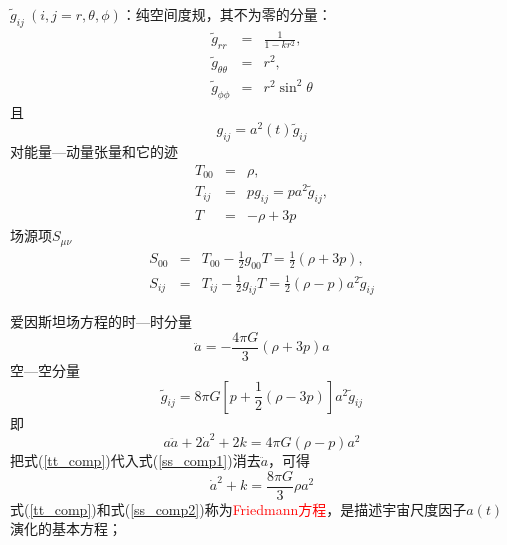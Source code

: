 \documentclass[12pt,a4paper]{article}
\begin{document}
$\tilde{g}_{ij}~ (i, j = r, \theta, \phi)$：纯空间度规，其不为零的分量：
\begin{eqnarray}
\nonumber \tilde{g}_{rr} &=& \frac{1}{1-kr^2}, \\
\nonumber \tilde{g}_{\theta\theta} &=& r^2, \\
\tilde{g}_{\phi\phi} &=& r^2 \sin^2 \theta
\end{eqnarray}
且
\begin{equation}
g_{ij} = a^2(t) \tilde{g}_{ij}
\end{equation}
对能量---动量张量和它的迹
\begin{eqnarray}
\nonumber T_{00} &=& \rho, \\
\nonumber T_{ij} &=& p g_{ij} = pa^2 \tilde{g}_{ij}, \\
T &=& -\rho +3p
\end{eqnarray}
场源项$S_{\mu\nu}$
\begin{eqnarray}
S_{00} &=& T_{00} -\frac{1}{2} g_{00} T = \frac{1}{2}(\rho +3p), \\
S_{ij}  &=& T_{ij} -\frac{1}{2} g_{ij} T = \frac{1}{2}(\rho -p) a^2 \tilde{g}_{ij}
\end{eqnarray}

爱因斯坦场方程的时—时分量
\begin{equation}
\ddot{a} = -\frac{4\pi G}{3} (\rho +3p) a
\label{tt_comp}
\end{equation}
空—空分量
\begin{equation}
[a\ddot{a} + 2\dot{a}^2 +2k] \tilde{g}_{ij} = 8\pi G\left[p +\frac{1}{2}(\rho -3p) \right] a^2 \tilde{g}_{ij}
\end{equation}
即
\begin{equation}
a\ddot{a} + 2\dot{a}^2 +2k = 4\pi G(\rho -p) a^2
\label{ss_comp1}
\end{equation}
把式(\ref{tt_comp})代入式(\ref{ss_comp1})消去$\ddot{a}$，可得
\begin{equation}
\dot{a}^2 +k = \frac{8\pi G}{3} \rho a^2
\label{ss_comp2}
\end{equation}
式(\ref{tt_comp})和式(\ref{ss_comp2})称为\textcolor{red}{Friedmann方程}，是描述宇宙尺度因子$a(t)$演化的基本方程；
\end{document}
